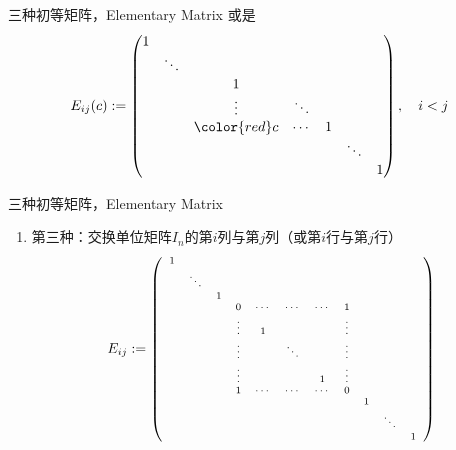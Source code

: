 
\begin{frame}

\begin{block}{三种初等矩阵，Elementary Matrix}
或是
\[
E_{ij}(c) := \begin{pmatrix} 1 & & & & & & \\ & \ddots & & & & & \\ & & 1 & & & & \\ & & \vdots & \ddots & & & \\ & & {\color{red}c} & \cdots & 1 & &  \\ & & & & & \ddots & \\ & & & & & & 1 \end{pmatrix}, \quad i < j
\]
\end{block}

\end{frame}


\begin{frame}

\begin{block}{三种初等矩阵，Elementary Matrix}
\begin{enumerate}
\addtocounter{enumi}{2}
\item 第三种：交换单位矩阵$I_n$的第$i$列与第$j$列（或第$i$行与第$j$行）
\[
\scriptsize
E_{ij} := \left(\begin{array}{*{11}c}
1 & & & & & & & & &  & \\ & \ddots & & & & & & & & & \\ & & 1 & & & & & & & & \\ & & & 0 & \cdots & \cdots & \cdots & 1 & & & \\ & & & \vdots & 1 & & & \vdots & & & \\ & & & \vdots & & \ddots & & \vdots & & & \\ & & & \vdots & & & 1 & \vdots & & & \\ & & & 1 & \cdots & \cdots & \cdots & 0 & & & \\ & & & & & & & & 1 & & \\ & & & & & & & & & \ddots & \\ & & & & & & & & & & 1 \end{array}\right)
\]
\end{enumerate}
\end{block}

\end{frame}


